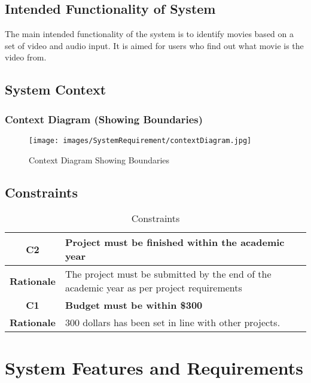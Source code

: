 \documentclass[titlepage]{article}
\begin{document}
\subsection{Intended Functionality of System}
The main intended functionality of the system is to identify movies based on a set of video and audio input. It is aimed for users who find out what movie is the video from.

\subsection{System Context}

\subsubsection{Context Diagram (Showing Boundaries)}
\begin{figure}[H]
    \centering
    \texttt{[image: images/SystemRequirement/contextDiagram.jpg]}
    \caption{Context Diagram Showing Boundaries}
    \label{fig:Context}
\end{figure}

\subsection{Constraints}
\begin{table}[H]
    \centering
    \begin{tabular}{|c|l|}
        \hline
        \textbf{C2} & \textbf{Project must be finished within the academic year} \\
        \hline
        \textbf{Rationale} & The project must be submitted by the end of the academic year as per project requirements \\
        \hline
        \textbf{C1} & \textbf{Budget must be within \$300}\\
        \hline
        \textbf{Rationale} & 300 dollars has been set in line with other projects.\\
        \hline
    \end{tabular}
    \caption{Constraints}
    \label{tab:Constaints}
\end{table}

\section{System Features and Requirements}
\end{document}
